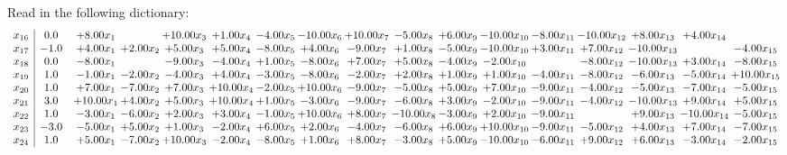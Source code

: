 \documentclass[9pt]{article}
\begin{document}
Read in the following dictionary:
\[\begin{array}{c| c c@{\hskip 2pt} c@{\hskip 2pt} c@{\hskip 2pt} c@{\hskip 2pt} c@{\hskip 2pt} c@{\hskip 2pt} c@{\hskip 2pt} c@{\hskip 2pt} c@{\hskip 2pt} c@{\hskip 2pt} c@{\hskip 2pt} c@{\hskip 2pt} c@{\hskip 2pt} c@{\hskip 2pt} c@{\hskip 2pt} }
 x_{16}   &  0.0 & +  8.00 x_{1} &   & + 10.00 x_{3} & +  1.00 x_{4} & -4.00 x_{5} & -10.00 x_{6} & + 10.00 x_{7} & -5.00 x_{8} & +  6.00 x_{9} & -10.00 x_{10} & -8.00 x_{11} & -10.00 x_{12} & +  8.00 x_{13} & +  4.00 x_{14} &   \\
 x_{17}   &  -1.0 & +  4.00 x_{1} & +  2.00 x_{2} & +  5.00 x_{3} & +  5.00 x_{4} & -8.00 x_{5} & +  4.00 x_{6} & -9.00 x_{7} & +  1.00 x_{8} & -5.00 x_{9} & -10.00 x_{10} & +  3.00 x_{11} & +  7.00 x_{12} & -10.00 x_{13} &   & -4.00 x_{15}\\
 x_{18}   &  0.0 & -8.00 x_{1} &   & -9.00 x_{3} & -4.00 x_{4} & +  1.00 x_{5} & -8.00 x_{6} & +  7.00 x_{7} & +  5.00 x_{8} & -4.00 x_{9} & -2.00 x_{10} &   & -8.00 x_{12} & -10.00 x_{13} & +  3.00 x_{14} & -8.00 x_{15}\\
 x_{19}   &  1.0 & -1.00 x_{1} & -2.00 x_{2} & -4.00 x_{3} & +  4.00 x_{4} & -3.00 x_{5} & -8.00 x_{6} & -2.00 x_{7} & +  2.00 x_{8} & +  1.00 x_{9} & +  1.00 x_{10} & -4.00 x_{11} & -8.00 x_{12} & -6.00 x_{13} & -5.00 x_{14} & + 10.00 x_{15}\\
 x_{20}   &  1.0 & +  7.00 x_{1} & -7.00 x_{2} & +  7.00 x_{3} & + 10.00 x_{4} & -2.00 x_{5} & + 10.00 x_{6} & -9.00 x_{7} & -5.00 x_{8} & +  5.00 x_{9} & +  7.00 x_{10} & -9.00 x_{11} & -4.00 x_{12} & -5.00 x_{13} & -7.00 x_{14} & -5.00 x_{15}\\
 x_{21}   &  3.0 & + 10.00 x_{1} & +  4.00 x_{2} & +  5.00 x_{3} & + 10.00 x_{4} & +  1.00 x_{5} & -3.00 x_{6} & -9.00 x_{7} & -6.00 x_{8} & +  3.00 x_{9} & -2.00 x_{10} & -9.00 x_{11} & -4.00 x_{12} & -10.00 x_{13} & +  9.00 x_{14} & +  5.00 x_{15}\\
 x_{22}   &  1.0 & -3.00 x_{1} & -6.00 x_{2} & +  2.00 x_{3} & +  3.00 x_{4} & -1.00 x_{5} & + 10.00 x_{6} & +  8.00 x_{7} & -10.00 x_{8} & -3.00 x_{9} & +  2.00 x_{10} & -9.00 x_{11} &   & +  9.00 x_{13} & -10.00 x_{14} & -5.00 x_{15}\\
 x_{23}   &  -3.0 & -5.00 x_{1} & +  5.00 x_{2} & +  1.00 x_{3} & -2.00 x_{4} & +  6.00 x_{5} & +  2.00 x_{6} & -4.00 x_{7} & -6.00 x_{8} & +  6.00 x_{9} & + 10.00 x_{10} & -9.00 x_{11} & -5.00 x_{12} & +  4.00 x_{13} & +  7.00 x_{14} & -7.00 x_{15}\\
 x_{24}   &  1.0 & +  5.00 x_{1} & -7.00 x_{2} & + 10.00 x_{3} & -2.00 x_{4} & -8.00 x_{5} & +  1.00 x_{6} & +  8.00 x_{7} & -3.00 x_{8} & +  5.00 x_{9} & -10.00 x_{10} & -6.00 x_{11} & +  9.00 x_{12} & +  6.00 x_{13} & -3.00 x_{14} & -2.00 x_{15}\\

\end{array}\]
\end{document}
